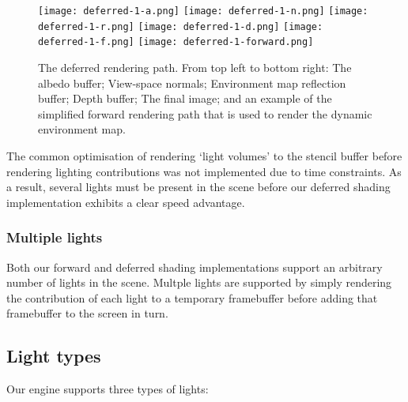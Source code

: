 \documentclass[11pt]{scrartcl} %
\begin{document}
            \begin{figure}%
                \centering
                \texttt{[image: deferred-1-a.png]}
                \texttt{[image: deferred-1-n.png]}
                \texttt{[image: deferred-1-r.png]}
                \texttt{[image: deferred-1-d.png]}
                \texttt{[image: deferred-1-f.png]}
                \texttt{[image: deferred-1-forward.png]}
                \caption[Deferred rendering buffers]{
                    The deferred rendering path. From top left to bottom right:
                    The albedo buffer;
                    View-space normals;
                    Environment map reflection buffer;
                    Depth buffer;
                    The final image;
                    and an example of the simplified forward rendering path that
                    is used to render the dynamic environment map.
                }
                \label{fig:deferred-rendering}
            \end{figure}

            The common optimisation of rendering `light volumes' to the stencil
            buffer before rendering lighting contributions was not implemented
            due to time constraints. As a result, several lights must be
            present in the scene before our deferred shading implementation
            exhibits a clear speed advantage.

        \subsubsection{Multiple lights}

            Both our forward and deferred shading implementations support an
            arbitrary number of lights in the scene. Multple lights are
            supported by simply rendering the contribution of each light to a
            temporary framebuffer before adding that framebuffer to the screen
            in turn.

        \subsection{Light types}

            Our engine supports three types of lights:
\end{document}

